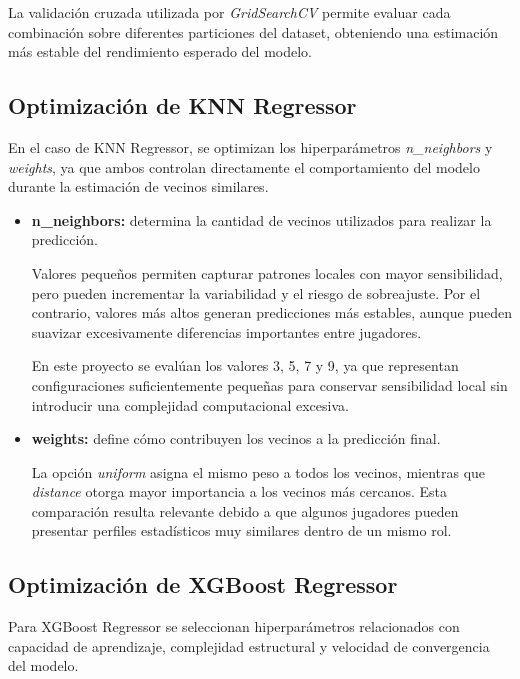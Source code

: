 \documentclass{ULBreport} %
\begin{document}
La validación cruzada utilizada por \textit{GridSearchCV} permite evaluar cada combinación sobre diferentes particiones del dataset, obteniendo una estimación más estable del rendimiento esperado del modelo.

\subsection{Optimización de KNN Regressor}

En el caso de KNN Regressor, se optimizan los hiperparámetros \textit{n\_neighbors} y \textit{weights}, ya que ambos controlan directamente el comportamiento del modelo durante la estimación de vecinos similares.

\begin{itemize}
    \item \textbf{n\_neighbors:} determina la cantidad de vecinos utilizados para realizar la predicción.
    
    Valores pequeños permiten capturar patrones locales con mayor sensibilidad, pero pueden incrementar la variabilidad y el riesgo de sobreajuste. Por el contrario, valores más altos generan predicciones más estables, aunque pueden suavizar excesivamente diferencias importantes entre jugadores.
    
    En este proyecto se evalúan los valores 3, 5, 7 y 9, ya que representan configuraciones suficientemente pequeñas para conservar sensibilidad local sin introducir una complejidad computacional excesiva.
    
    \item \textbf{weights:} define cómo contribuyen los vecinos a la predicción final.
    
    La opción \textit{uniform} asigna el mismo peso a todos los vecinos, mientras que \textit{distance} otorga mayor importancia a los vecinos más cercanos. Esta comparación resulta relevante debido a que algunos jugadores pueden presentar perfiles estadísticos muy similares dentro de un mismo rol.
\end{itemize}

\subsection{Optimización de XGBoost Regressor}

Para XGBoost Regressor se seleccionan hiperparámetros relacionados con capacidad de aprendizaje, complejidad estructural y velocidad de convergencia del modelo.
\end{document}
